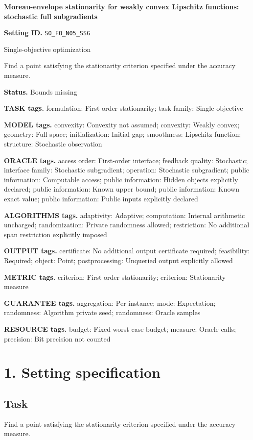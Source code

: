 \documentclass[10pt,a4paper]{article}
\begin{document}
\raggedright

{\LARGE\bfseries\sffamily\color{AtlasNavy} Moreau-envelope stationarity for weakly convex Lipschitz functions: stochastic full subgradients\par}\vspace{5pt}
\textbf{Setting ID.} \texttt{SO\_\allowbreak{}FO\_\allowbreak{}N05\_\allowbreak{}SSG}

Single-objective optimization

Find a point satisfying the stationarity criterion specified under the accuracy measure.

\textbf{Status.} Bounds missing

\textbf{TASK tags.} formulation: First order stationarity; task family: Single objective

\textbf{MODEL tags.} convexity: Convexity not assumed; convexity: Weakly convex; geometry: Full space; initialization: Initial gap; smoothness: Lipschitz function; structure: Stochastic observation

\textbf{ORACLE tags.} access order: First-order interface; feedback quality: Stochastic; interface family: Stochastic subgradient; operation: Stochastic subgradient; public information: Computable access; public information: Hidden objects explicitly declared; public information: Known upper bound; public information: Known exact value; public information: Public inputs explicitly declared

\textbf{ALGORITHMS tags.} adaptivity: Adaptive; computation: Internal arithmetic uncharged; randomization: Private randomness allowed; restriction: No additional span restriction explicitly imposed

\textbf{OUTPUT tags.} certificate: No additional output certificate required; feasibility: Required; object: Point; postprocessing: Unqueried output explicitly allowed

\textbf{METRIC tags.} criterion: First order stationarity; criterion: Stationarity measure

\textbf{GUARANTEE tags.} aggregation: Per instance; mode: Expectation; randomness: Algorithm private seed; randomness: Oracle samples

\textbf{RESOURCE tags.} budget: Fixed worst-case budget; measure: Oracle calls; precision: Bit precision not counted

\section{1. Setting specification}
\subsection{Task}
Find a point satisfying the stationarity criterion specified under the accuracy measure.
\end{document}
